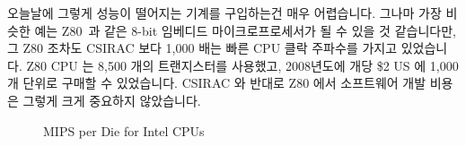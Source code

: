 
오늘날에 그렇게 성능이 떨어지는 기계를 구입하는건 매우 어렵습니다.
그나마 가장 비슷한 예는 Z80~\cite{z80Wikipedia}과 같은 8-bit 임베디드
마이크로프로세서가 될 수 있을 것 같습니다만, 그 Z80 조차도 CSIRAC 보다 1,000
배는 빠른 CPU 클락 주파수를 가지고 있었습니다.
Z80 CPU 는 8,500 개의 트랜지스터를 사용했고, 2008년도에 개당 \$2 US 에 1,000개
단위로 구매할 수 있었습니다.
CSIRAC 와 반대로 Z80 에서 소프트웨어 개발 비용은 그렇게 크게 중요하지
않았습니다.


\begin{figure}[tb]
\begin{center}
\end{center}
\caption{MIPS per Die for Intel CPUs}
\label{fig:intro:MIPS per Die for Intel CPUs}
\end{figure}

